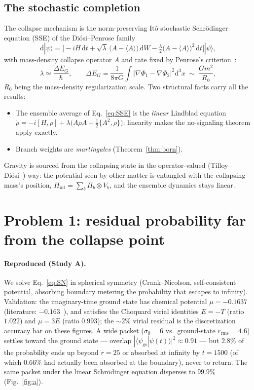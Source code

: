 \documentclass[11pt,a4paper]{article}
\newcommand{\dd}{\mathrm{d}}
\newcommand{\braket}[1]{\langle #1 \rangle}
\newcommand{\ket}[1]{|#1\rangle}
\begin{document}
\subsection{The stochastic completion}
The collapse mechanism is the norm-preserving It\^o stochastic Schr\"odinger equation
(SSE) of the Di\'osi--Penrose family~\cite{diosi87,diosi89,bassi13}
\begin{equation}
  \dd\ket{\psi} = \Big[ -iH\,\dd t
    + \sqrt{\lambda}\,\big(A - \braket{A}\big)\,\dd W
    - \tfrac{\lambda}{2}\big(A - \braket{A}\big)^2\,\dd t \Big]\ket{\psi},
  \label{eq:SSE}
\end{equation}
with mass-density collapse operator $A$ and rate fixed by Penrose's criterion~\cite{penrose96}:
\begin{equation}
  \lambda \simeq \frac{\Delta E_G}{\hbar}, \qquad
  \Delta E_G = \frac{1}{8\pi G}\int \big|\nabla\Phi_1 - \nabla\Phi_2\big|^2 \dd^3x
  \;\sim\; \frac{Gm^2}{R_0},
\end{equation}
$R_0$ being the mass-density regularization scale. Two structural facts carry all the
results:
\begin{itemize}
  \item[\textbf{(F1)}] The ensemble average of Eq.~\eqref{eq:SSE} is the \emph{linear}
  Lindblad equation
  $\dot\rho = -i[H,\rho] + \lambda\big(A\rho A - \tfrac12\{A^2,\rho\}\big)$;
  linearity makes the no-signaling theorem apply exactly.
  \item[\textbf{(F2)}] Branch weights are \emph{martingales} (Theorem~\ref{thm:born}).
\end{itemize}
Gravity is sourced from the collapsing state in the operator-valued
(Tilloy--Di\'osi~\cite{tilloy16}) way:
the potential seen by other matter is entangled with the collapsing mass's position,
$H_{\mathrm{int}} = \sum_b \Pi_b \otimes V_b$, and the ensemble dynamics stays linear.

\section{Problem 1: residual probability far from the collapse point}

\paragraph{Reproduced (Study A).}
We solve Eq.~\eqref{eq:SN} in spherical symmetry (Crank--Nicolson, self-consistent
potential, absorbing boundary metering the probability that escapes to infinity).
Validation: the imaginary-time ground state has chemical potential $\mu = -0.1637$
(literature: $-0.163$~\cite{moroz98}), and satisfies the Choquard virial identities $E=-T$
(ratio $1.022$) and $\mu = 3E$ (ratio $0.993$); the $\sim2\%$ virial residual is the
discretization accuracy bar on these figures. A wide packet ($\sigma_0 = 6$ vs.\ ground-state
$r_{\mathrm{rms}} = 4.6$) settles toward the ground state --- overlap
$|\braket{\psi_{\mathrm{gs}}|\psi(t)}|^2 \approx 0.91$ --- but $2.8\%$ of the probability
ends up beyond $r = 25$ or absorbed at infinity by $t=1500$ (of which $0.66\%$ had actually
been absorbed at the boundary), never to return. The same
packet under the linear Schr\"odinger equation disperses to $99.9\%$
(Fig.~\ref{fig:a}).
\end{document}
